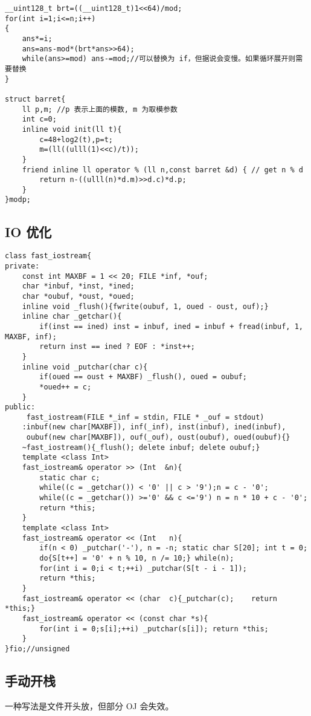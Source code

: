 \documentclass[12pt]{ctexart}
\begin{document}
\begin{lstlisting}
__uint128_t brt=((__uint128_t)1<<64)/mod;
for(int i=1;i<=n;i++)
{
	ans*=i;
	ans=ans-mod*(brt*ans>>64);
	while(ans>=mod) ans-=mod;//可以替换为 if，但据说会变慢。如果循环展开则需要替换
}

struct barret{
    ll p,m; //p 表示上面的模数, m 为取模参数
    int c=0;
    inline void init(ll t){
    	c=48+log2(t),p=t;
		m=(ll((ulll(1)<<c)/t));
	}
    friend inline ll operator % (ll n,const barret &d) { // get n % d
        return n-((ulll(n)*d.m)>>d.c)*d.p;
    }
}modp;
\end{lstlisting}

\subsection{IO 优化}

\begin{lstlisting}
class fast_iostream{
private:
	const int MAXBF = 1 << 20; FILE *inf, *ouf;
	char *inbuf, *inst, *ined;
	char *oubuf, *oust, *oued;
	inline void _flush(){fwrite(oubuf, 1, oued - oust, ouf);}
	inline char _getchar(){
		if(inst == ined) inst = inbuf, ined = inbuf + fread(inbuf, 1, MAXBF, inf);
		return inst == ined ? EOF : *inst++;
	}
	inline void _putchar(char c){
		if(oued == oust + MAXBF) _flush(), oued = oubuf;
		*oued++ = c;
	}
public:
	 fast_iostream(FILE *_inf = stdin, FILE * _ouf = stdout)
	:inbuf(new char[MAXBF]), inf(_inf), inst(inbuf), ined(inbuf),
	 oubuf(new char[MAXBF]), ouf(_ouf), oust(oubuf), oued(oubuf){}
	~fast_iostream(){_flush(); delete inbuf; delete oubuf;}
	template <class Int>
	fast_iostream& operator >> (Int  &n){
		static char c;
		while((c = _getchar()) < '0' || c > '9');n = c - '0';
		while((c = _getchar()) >='0' && c <='9') n = n * 10 + c - '0';
		return *this;
	}
	template <class Int>
	fast_iostream& operator << (Int   n){
		if(n < 0) _putchar('-'), n = -n; static char S[20]; int t = 0;
		do{S[t++] = '0' + n % 10, n /= 10;} while(n);
		for(int i = 0;i < t;++i) _putchar(S[t - i - 1]);
		return *this;
	}
	fast_iostream& operator << (char  c){_putchar(c);    return *this;}
	fast_iostream& operator << (const char *s){
		for(int i = 0;s[i];++i) _putchar(s[i]); return *this;
	}
}fio;//unsigned
\end{lstlisting}
\subsection{手动开栈}

一种写法是文件开头放，但部分 OJ 会失效。
\end{document}
